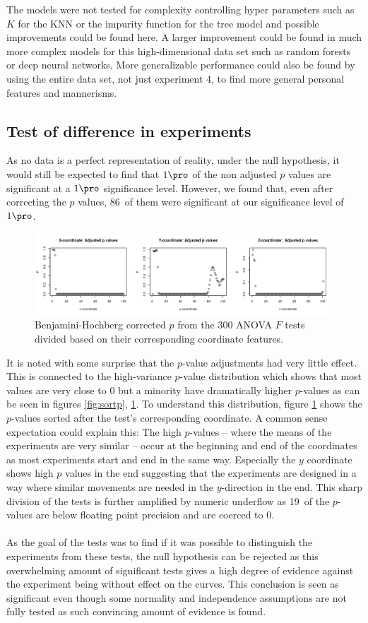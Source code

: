 \documentclass[11pt,fleqn]{article}
\begin{document}
The models were not tested for complexity controlling hyper parameters such as \(K\) for the KNN or the impurity function for the tree model and possible improvements could be found here. A larger improvement could be found in much more complex models for this high-dimensional data set such as random forests or deep neural networks. More generalizable performance could also be found by using the entire data set, not just experiment 4, to find more general personal  features and mannerisms.

\subsection{Test of difference in experiments}
As no data is a perfect representation of reality, under the null hypothesis, it would still be expected to find that $ 1\pro $ of the non adjusted $ p $ values are significant at a $ 1\pro $ significance level. However, we found that, even after correcting the $ p $ values, 86\pro\ of them were significant at our significance level of $ 1\pro $.
\begin{figure}[H]
	\centering
	\includegraphics[width=.8\textwidth]{coordinate_ps}
	\caption{Benjamini-Hochberg corrected $ p $ from the 300 ANOVA \(F\) tests divided based on their corresponding coordinate features.}\label{fig:unsortp}
\end{figure}\noindent 
It is noted with some surprise that the \(p\)-value adjustments had very little effect. This is connected to the high-variance \(p\)-value distribution which shows that most values are very close to 0 but a minority have dramatically higher \(p\)-values as can be seen in figures \ref{fig:sortp}, \ref{fig:unsortp}. To understand this distribution, figure \ref{fig:unsortp} shows the \(p\)-values sorted after the test's corresponding coordinate.  
A common sense expectation could explain this: The high \(p\)-values -- where the means of the experiments are very similar -- occur at the beginning and end of the coordinates as most experiments start and end in the same way. 
Especially the \(y\) coordinate shows high \(p\) values in the end suggesting that the experiments are designed in a way where similar movements are needed in the \(y\)-direction in the end. 
This sharp division of the tests is further amplified by numeric underflow as 19\pro\ of the \(p\)-values are below floating point precision and are coerced to 0.
\\\\
As the goal of the tests was to find if it was possible to distinguish the experiments from these tests, the null hypothesis can be rejected as this overwhelming amount of significant tests gives a high degree of evidence against the experiment being without effect on the curves.
This conclusion is seen as significant even though some normality and independence assumptions are not fully tested as such convincing amount of evidence is found.
 
\end{document}
